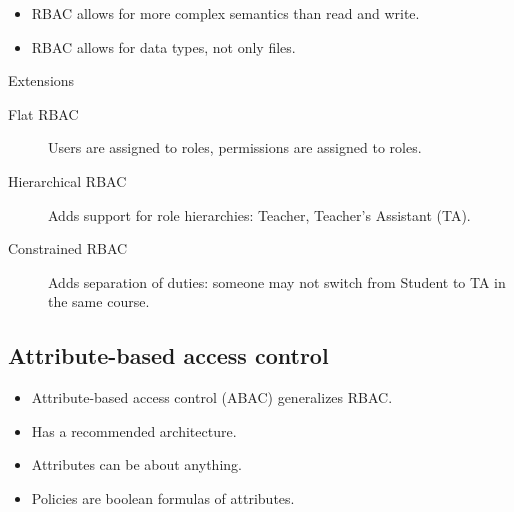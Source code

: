 \begin{frame}
  \begin{remark}
    \begin{itemize}
      \item RBAC allows for more complex semantics than read and write.
      \item RBAC allows for data types, not only files.
    \end{itemize}
  \end{remark}
\end{frame}

\begin{frame}
  \begin{block}{Extensions}
    \begin{description}
      \item[Flat RBAC] Users are assigned to roles, permissions are assigned to 
        roles.

      \item[Hierarchical RBAC]
        Adds support for role hierarchies: Teacher, Teacher's Assistant (TA).

      \item[Constrained RBAC]
        Adds separation of duties: someone may not switch from Student to TA in 
        the same course.
    \end{description}
  \end{block}
\end{frame}

\subsection{Attribute-based access control}

\begin{frame}
  \begin{remark}
    \begin{itemize}
      \item Attribute-based access control (ABAC) generalizes RBAC.
    \end{itemize}
  \end{remark}

  \begin{idea}
    \begin{itemize}
      \item Has a recommended architecture.
      \item Attributes can be about anything.
      \item Policies are boolean formulas of attributes.
    \end{itemize}
  \end{idea}
\end{frame}

